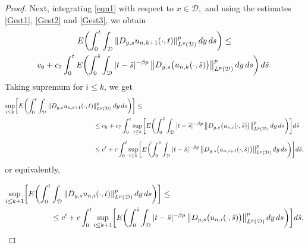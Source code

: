 \documentclass[reqno]{amsart}
\numberwithin{equation}{section}
\newcommand{\cd}{\mathcal{D}}
\begin{document}
\begin{proof}
Next, integrating  \eqref{eqn1} with respect to $ x\in \mathcal D, $ and using the estimates \eqref{Gest1}, \eqref{Gest2} and \eqref{Gest3}, we obtain
\begin{multline}
E\biggl(\int_0^t\int_{\cd} \|D_{y,s}u_{n,k+1}(\cdot,t)\|^p_{L^p(\cd)}\,dy\,ds\biggr)\leq\\ c_6+ c_7\int_0^t E\biggl
(\int_0^{\Tilde{s}}\int_{\cd}  |t-\Tilde{s}|^{-\beta p} \, \big{\|}D_{y,s}\bigl(u_{n,k}(\cdot,\Tilde{s})\bigr) \big{\|}^p_{L^p(\cd)}\, dy\,ds\biggr)\, d\Tilde{s}.\label{Gest4}
\end{multline}
Taking supremum for $i\leq k$, we get
\begin{align*}
\underset{i\leq k}{\text{sup}}\bigg{[}E\biggl{(}\int_{0}^{t}\int_{\cd}\|D_{y,s}u_{n,i+1}(\cdot,t)&\|^p_{L^p(\cd)}\,dy\,ds\biggr{)}\bigg{]} \leq\\
&\leq c_6+ c_7\int_0^t\underset{i\leq k}{\text{sup}}\bigg{[}E\biggl{(}\int_{0}^{\Tilde{s}}\int_{\cd}  |t-\Tilde{s}|^{-\beta p} \, \big{\|}D_{y,s}\bigl{(}u_{n,i}(\cdot,\Tilde{s})\bigr{)}
\big{\|}^p_{L^p(\cd)}\, dy\,ds\biggr{)}\bigg{]} d\Tilde{s}\\[0.2cm]
&\leq c'+c\int_0^t\underset{i\leq k}{\text{sup}}\bigg{[}E\biggl{(}\int_{0}^{\Tilde{s}}\int_{\cd}  |t-\Tilde{s}|^{-\beta p} \, \big{\|}D_{y,s}
\bigl{(}u_{n,i+1}(\cdot,\Tilde{s})\bigr{)} \big{\|}^p_{L^p(\cd)}\,dy\,ds\biggr{)}\bigg{]}
d\Tilde{s},
\end{align*}
or equivalently,

\begin{equation}\label{dd1}
\begin{split}
\underset{i\leq k+1}{\text{sup}}\bigg{[}E\biggl{(}\int_0^t&\int_{\cd}\|D_{y,s}u_{n,i}(\cdot,t)\|^p_{L^p(\cd)}\,dy\,ds\biggr{)}\bigg{]}\leq\\
&\leq c' + c\int_{0}^{t}\underset{i\leq k+1}{\text{sup}}\bigg{[}E\biggl{(}\int_0^{\Tilde{s}}\int_{\cd}  |t-\Tilde{s}|^{-\beta p} \, \big{\|}D_{y,s}\bigl{(}u_{n,i}(\cdot,\Tilde{s})\bigr{)} \big{\|}^p_{L^p(\cd)}\, dy\,ds\biggr{)}\bigg{]} d\Tilde{s}.
\end{split}
\end{equation}


\end{proof}
\end{document}
